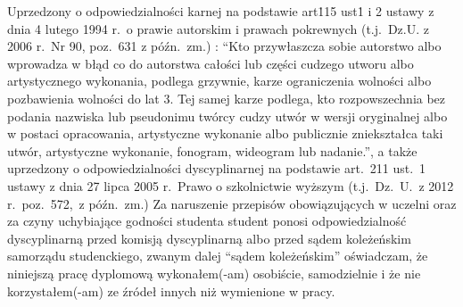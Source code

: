 \begin{titlepage}
\noindent
Uprzedzony o odpowiedzialności karnej na podstawie art\. 115 ust\. 1 i 2 ustawy z dnia 4 lutego 1994 r.\ o prawie autorskim i prawach pokrewnych (t.j.\ Dz.U. z 2006 r.\ Nr 90, poz.\ 631 z późn.\ zm.) : ``Kto przywłaszcza sobie autorstwo albo wprowadza w błąd co do autorstwa całości lub części cudzego utworu albo artystycznego wykonania, podlega grzywnie, karze ograniczenia wolności albo pozbawienia wolności do lat 3. Tej samej karze podlega, kto rozpowszechnia bez podania nazwiska lub pseudonimu twórcy cudzy utwór w wersji oryginalnej albo w postaci opracowania, artystyczne wykonanie albo publicznie zniekształca taki utwór, artystyczne wykonanie, fonogram, wideogram lub nadanie.'', a także uprzedzony o odpowiedzialności dyscyplinarnej na podstawie art.\ 211 ust.\ 1 ustawy z dnia  27 lipca 2005 r.\ Prawo o szkolnictwie wyższym (t.j.\ Dz.\ U.\ z 2012 r.\ poz.\ 572,\ z późn.\ zm.) Za naruszenie przepisów obowiązujących w uczelni oraz za czyny uchybiające godności studenta student ponosi odpowiedzialność dyscyplinarną przed komisją dyscyplinarną albo przed sądem koleżeńskim samorządu studenckiego, zwanym dalej ``sądem koleżeńskim'' oświadczam, że niniejszą pracę dyplomową wykonałem(-am) osobiście, samodzielnie i że nie korzystałem(-am) ze źródeł innych niż wymienione w pracy.

\hspace{6cm}
\makebox[6cm][s]{\dotfill}\par
\hspace{6cm}
\end{titlepage}
